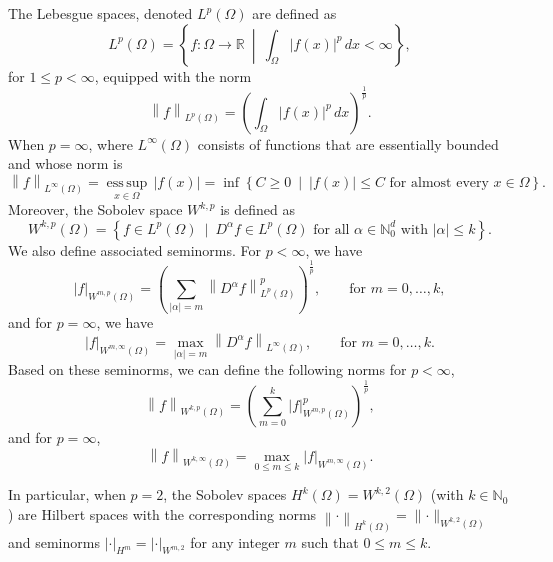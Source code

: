 \documentclass{article}
\newcommand{\fr}{\frac}
\newcommand{\OInt}[1]{\int_{\Omega} #1 \, dx}
\newcommand{\LnormD}[3]{\left\lVert #1 \right\rVert_{L^{#2} \left({#3}\right)}}
\newcommand{\HnormD}[3]{\left\lVert #1 \right\rVert_{H^{#2} \left({#3}\right)}}
\newcommand{\WnormD}[4]{\left\lVert #1 \right\rVert_{W^{#2, #3} ({#4})}}
\numberwithin{Def}{section}
\newcommand{\N}{\mathbb N}
\newcommand{\R}{\mathbb R}
\begin{document}
The Lebesgue spaces, denoted $L^p (\Omega)$ are defined as 
\begin{equation}
    L^p (\Omega) = \left\{ f: \Omega \to \R \ \middle| \ \OInt{|f(x)|^p} < \infty \right\},
\end{equation}
for $1 \leq p < \infty$, equipped with the norm
\begin{equation}
    \LnormD{f}{p}{\Omega} = \left( \OInt{|f(x)|^p }\right)^\fr{1}{p}.
\end{equation}
When $p = \infty$, where $L^\infty (\Omega)$ consists of functions that are essentially bounded and whose norm is
\begin{equation}
    \LnormD{f}{\infty}{\Omega} = \operatorname*{ess\,sup}_{x \in \Omega} \, |f(x)| = \inf \left\{ C \geq 0 \ \mid \ |f(x)| \leq C \text{ for almost every } x \in \Omega \right\}.
\end{equation}
Moreover, the Sobolev space $W^{k,p}$ is defined as 
\begin{equation}
    W^{k,p} (\Omega) = \left\{ f \in L^p (\Omega) \ \mid \  D^\alpha f \in L^p (\Omega) \text{ for all } \alpha \in \N_0^d \text{ with } |\alpha| \leq k \right\}.
\end{equation}
We also define associated seminorms. For $p < \infty$, we have
\begin{equation}
    |f|_{W^{m,p} (\Omega)} = \left( \sum_{|\alpha| =m} \LnormD{D^\alpha f}{p}{\Omega}^p \right)^\fr{1}{p}, \qquad \text{for } m =0,\dots,k,
\end{equation}
and for $p=\infty$, we have
\begin{equation}
    |f|_{W^{m,\infty} (\Omega)} = \max_{|\alpha| = m} \LnormD{D^\alpha f}{\infty}{\Omega} , \qquad \text{for } m =0,\dots,k.
\end{equation}
Based on these seminorms, we can define the following norms for $p < \infty$,
\begin{equation}
    \WnormD{f}{k}{p}{\Omega} = \left( \sum_{m=0}^k |f|_{W^{m,p} (\Omega)}^p \right)^\fr{1}{p},
\end{equation}
and for $p = \infty$,
\begin{equation}
    \WnormD{f}{k}{\infty}{\Omega} = \max_{0 \leq m \leq k} |f|_{W^{m,\infty} (\Omega)}.
\end{equation}

In particular, when $p = 2$, the Sobolev spaces $H^k (\Omega) = W^{k, 2} (\Omega)$ (with $k \in \N_0$) are Hilbert spaces with the corresponding norms $\HnormD{\cdot}{k}{\Omega} = \lVert \cdot \rVert_{W^{k,2} (\Omega)}$ and seminorms $| \cdot |_{H^m} = | \cdot |_{W^{m,2}}$ for any integer $m$ such that $0 \leq m \leq k$.
\end{document}
